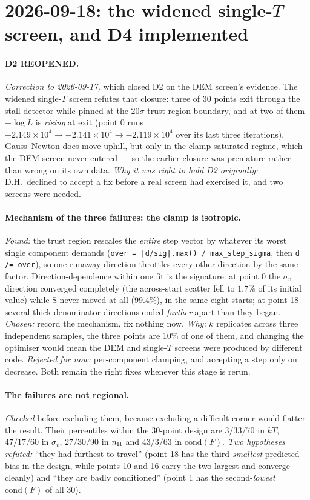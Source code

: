 \documentclass[11pt]{article}
\begin{document}
\section*{2026-09-18: the widened single-$T$ screen, and D4 implemented}

\paragraph{D2 REOPENED.} \emph{Correction to 2026-09-17,} which closed D2 on
the DEM screen's evidence. The widened single-$T$ screen refutes that closure:
three of 30 points exit through the stall detector while pinned at the
$20\sigma$ trust-region boundary, and at two of them $-\log L$ is \emph{rising}
at exit (point 0 runs $-2.149\times10^4 \to -2.141\times10^4 \to
-2.119\times10^4$ over its last three iterations). Gauss--Newton does move
uphill, but only in the clamp-saturated regime, which the DEM screen never
entered --- so the earlier closure was premature rather than wrong on its own
data. \emph{Why it was right to hold D2 originally:} D.H.\ declined to accept a
fix before a real screen had exercised it, and two screens were needed.

\paragraph{Mechanism of the three failures: the clamp is isotropic.}
\emph{Found:} the trust region rescales the \emph{entire} step vector by
whatever its worst single component demands (\texttt{over = |d/sig|.max() /
max\_step\_sigma}, then \texttt{d /= over}), so one runaway direction throttles
every other direction by the same factor. Direction-dependence within one fit
is the signature: at point 0 the $\sigma_v$ direction converged completely (the
across-start scatter fell to $1.7\%$ of its initial value) while S never moved
at all ($99.4\%$), in the same eight starts; at point 18 several
thick-denominator directions ended \emph{further} apart than they began.
\emph{Chosen:} record the mechanism, fix nothing now. \emph{Why:} $k$
replicates across three independent samples, the three points are 10\% of one
of them, and changing the optimiser would mean the DEM and single-$T$ screens
were produced by different code. \emph{Rejected for now:} per-component
clamping, and accepting a step only on decrease. Both remain the right fixes
whenever this stage is rerun.

\paragraph{The failures are not regional.} \emph{Checked} before excluding
them, because excluding a difficult corner would flatter the result. Their
percentiles within the 30-point design are $3/33/70$ in $kT$, $47/17/60$ in
$\sigma_v$, $27/30/90$ in $n_{\rm H}$ and $43/3/63$ in $\mathrm{cond}(F)$.
\emph{Two hypotheses refuted:} ``they had furthest to travel'' (point 18 has
the third-\emph{smallest} predicted bias in the design, while points 10 and 16
carry the two largest and converge cleanly) and ``they are badly conditioned''
(point 1 has the second-\emph{lowest} $\mathrm{cond}(F)$ of all 30).
\end{document}
